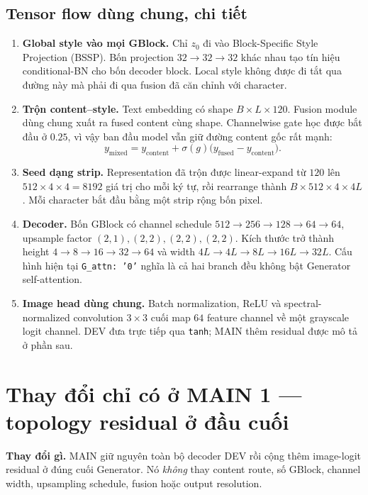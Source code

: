 \documentclass[10pt,a4paper]{article}
\begin{document}
\subsection*{Tensor flow dùng chung, chi tiết}

\begin{enumerate}[leftmargin=1.55em,itemsep=3pt]
  \item \textbf{Global style vào mọi GBlock.} Chỉ $z_0$ đi vào Block-Specific Style Projection (BSSP). Bốn projection $32\rightarrow32\rightarrow32$ khác nhau tạo tín hiệu conditional-BN cho bốn decoder block. Local style không được đi tắt qua đường này mà phải đi qua fusion đã căn chỉnh với character.
  \item \textbf{Trộn content--style.} Text embedding có shape $B\times L\times120$. Fusion module dùng chung xuất ra fused content cùng shape. Channelwise gate học được bắt đầu ở $0.25$, vì vậy ban đầu model vẫn giữ đường content gốc rất mạnh:
  \[
    y_{\mathrm{mixed}}=y_{\mathrm{content}}+\sigma(g)\big(y_{\mathrm{fused}}-y_{\mathrm{content}}\big).
  \]
  \item \textbf{Seed dạng strip.} Representation đã trộn được linear-expand từ $120$ lên $512\times4\times4=8192$ giá trị cho mỗi ký tự, rồi rearrange thành $B\times512\times4\times4L$. Mỗi character bắt đầu bằng một strip rộng bốn pixel.
  \item \textbf{Decoder.} Bốn GBlock có channel schedule $512\rightarrow256\rightarrow128\rightarrow64\rightarrow64$, upsample factor $(2,1),(2,2),(2,2),(2,2)$. Kích thước trở thành height $4\rightarrow8\rightarrow16\rightarrow32\rightarrow64$ và width $4L\rightarrow4L\rightarrow8L\rightarrow16L\rightarrow32L$. Cấu hình hiện tại \texttt{G\_attn: '0'} nghĩa là cả hai branch đều không bật Generator self-attention.
  \item \textbf{Image head dùng chung.} Batch normalization, ReLU và spectral-normalized convolution $3\times3$ cuối map $64$ feature channel về một grayscale logit channel. DEV đưa trực tiếp qua \texttt{tanh}; MAIN thêm residual được mô tả ở phần sau.
\end{enumerate}

\section{Thay đổi chỉ có ở MAIN 1 --- topology residual ở đầu cuối}

\textbf{Thay đổi gì.} MAIN giữ nguyên toàn bộ decoder DEV rồi cộng thêm image-logit residual ở đúng cuối Generator. Nó \emph{không} thay content route, số GBlock, channel width, upsampling schedule, fusion hoặc output resolution.
\end{document}
